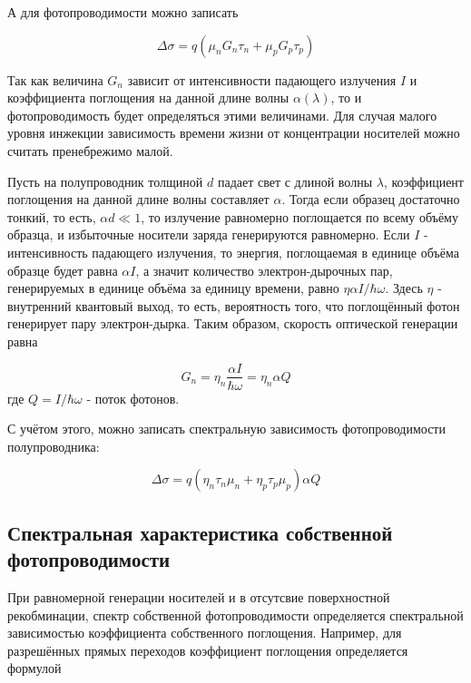 А для фотопроводимости можно записать

\begin{equation}
\Delta \sigma = q (\mu_{n} G_{n} \tau_{n} + \mu_{p} G_{p} \tau_{p})
\end{equation}

Так как величина $G_{n}$ зависит от интенсивности падающего излучения $I$ и коэффициента поглощения на данной длине волны $\alpha(\lambda)$, то и фотопроводимость будет определяться этими величинами. Для случая малого уровня инжекции зависимость времени жизни от концентрации носителей можно считать пренебрежимо малой.

Пусть на полупроводник толщиной $d$ падает свет с длиной волны $\lambda$, коэффициент поглощения на данной длине волны составляет $\alpha$. Тогда если образец достаточно тонкий, то есть, $\alpha d \ll 1$, то излучение равномерно поглощается по всему объёму образца, и избыточные носители заряда генерируются равномерно. Если $I$ - интенсивность падающего излучения, то энергия, поглощаемая в единице объёма образце будет равна $\alpha I$, а значит количество электрон-дырочных пар, генерируемых в единице объёма за единицу времени, равно $\eta \alpha I / \hbar \omega$. Здесь $\eta$ - внутренний квантовый выход, то есть, вероятность того, что поглощённый фотон генерирует пару электрон-дырка.
Таким образом, скорость оптической генерации равна

\begin{equation}
G_{n} = \eta_{n} \frac{\alpha I}{\hbar \omega} = \eta_{n} \alpha Q
\end{equation}
где $Q = I / \hbar \omega$  - поток фотонов.

С учётом этого, можно записать спектральную зависимость фотопроводимости полупроводника:

\begin{equation}
\Delta \sigma = q (\eta_{n} \tau_{n} \mu_{n} + \eta_{p} \tau_{p} \mu_{p}) \alpha Q
\end{equation}

\subsection{Спектральная характеристика собственной фотопроводимости}
При равномерной генерации носителей и в отсутсвие поверхностной рекобминации, спектр собственной фотопроводимости определяется спектральной зависимостью коэффициента собственного поглощения. Например, для разрешённых прямых переходов коэффициент поглощения определяется формулой

